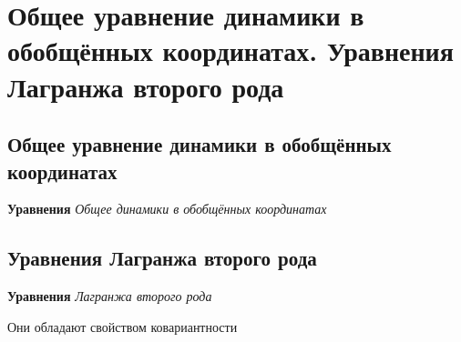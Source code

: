 \documentclass[a4paper, 14pt]{article}
\begin{document}
    \section{Общее уравнение динамики в обобщённых координатах.
    Уравнения Лагранжа второго рода}
    
    \subsection{Общее уравнение динамики в обобщённых координатах}
    
    \textbf{Уравнения} \textit{Общее динамики в обобщённых координатах}
    
    \subsection{Уравнения Лагранжа второго рода}
    
    \textbf{Уравнения} \textit{Лагранжа второго рода}
    
    Они обладают свойством ковариантности
    
\end{document}
